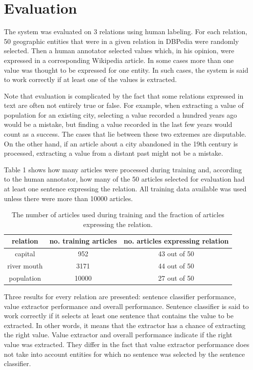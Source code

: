 \documentclass[10pt,a5paper,twoside]{article}
\begin{document}
\section{Evaluation}
The system was evaluated on 3 relations using human labeling. For each relation, 50 geographic entities that were in a given relation in DBPedia were randomly selected. Then a human annotator selected values which, in his opinion, were expressed in a corresponding Wikipedia article. In some cases more than one value was thought to be expressed for one entity. In such cases, the system is said to work correctly if at least one of the values is extracted.

Note that evaluation is complicated by the fact that some relations expressed in text are often not entirely true or false. For example, when extracting a value of population for an existing city, selecting a value recorded a hundred years ago would be a mistake, but finding a value recorded in the last few years would count as a success. The cases that lie between these two extremes are disputable. On the other hand, if an article about a city abandoned in the 19th century is processed, extracting a value from a distant past might not be a mistake.

Table 1 shows how many articles were processed during training and, according to the human annotator, how many of the 50 articles selected for evaluation had at least one sentence expressing the relation. All training data available was used unless there were more than 10000 articles.
\begin{table}[!h]
\setcounter{table}{0}
\centering
\begin{tabular}{ | c | c | c | }
    \hline
    relation & no. training articles & no. articles expressing relation \\ \hline \hline
    capital & 952 & 43 out of 50 \\ \hline
    river mouth & 3171 & 44 out of 50\\ \hline
    population & 10000 & 27 out of 50 \\ \hline
\end{tabular}
\caption{The number of articles used during training and the fraction of articles expressing the relation.}
\end{table}

Three results for every relation are presented: sentence classifier performance, value extractor performance and overall performance. Sentence classifier is said to work correctly if it selects at least one sentence that contains the value to be extracted. In other words, it means that the extractor has a chance of extracting the right value. Value extractor and overall performance indicate if the right value was extracted. They differ in the fact that value extractor performance does not take into account entities for which no sentence was selected by the sentence classifier.
\end{document}

